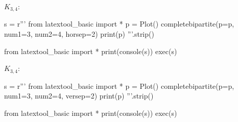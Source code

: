 $K_{3,4}$:
\begin{python}
s = r'''
from latextool_basic import *
p = Plot()
completebipartite(p=p, num1=3, num2=4, horsep=2)
print(p)
'''.strip()

from latextool_basic import *
print(console(s))
exec(s)
\end{python}


$K_{3,4}$:
\begin{python}
s = r'''
from latextool_basic import *
p = Plot()
completebipartite(p=p, num1=3, num2=4, versep=2)
print(p)
'''.strip()

from latextool_basic import *
print(console(s))
exec(s)
\end{python}


